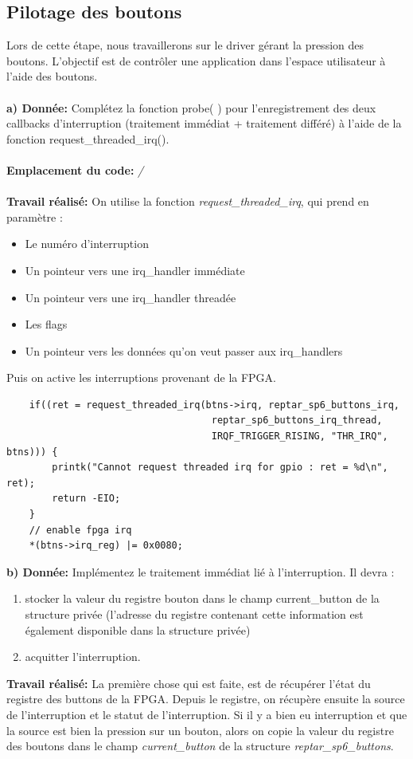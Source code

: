 \subsection{Pilotage des boutons}
Lors de cette étape, nous travaillerons sur le driver gérant la pression des boutons. L'objectif est de
contrôler une application dans l'espace utilisateur à l'aide des boutons.\\\\
\textbf{a) Donnée: }Complétez la fonction probe( ) pour l'enregistrement des deux callbacks d'interruption (traitement
immédiat + traitement différé) à l'aide de la fonction request\_threaded\_irq().\\\\
\color{red}\textbf{Emplacement du code: }\textit{/}\\\\ \color{black}
\textbf{Travail réalisé: }
On utilise la fonction \textit{request\_threaded\_irq}, qui prend en paramètre :
\begin{itemize}
	\item Le numéro d'interruption
	\item Un pointeur vers une irq\_handler immédiate
	\item Un pointeur vers une irq\_handler threadée
	\item Les flags 
	\item Un pointeur vers les données qu'on veut passer aux irq\_handlers
\end{itemize} 
Puis on active les interruptions provenant de la FPGA.
\begin{lstlisting}
	if((ret = request_threaded_irq(btns->irq, reptar_sp6_buttons_irq, 
									reptar_sp6_buttons_irq_thread, 
									IRQF_TRIGGER_RISING, "THR_IRQ", btns))) {
		printk("Cannot request threaded irq for gpio : ret = %d\n", ret);
		return -EIO;
	}
	// enable fpga irq
	*(btns->irq_reg) |= 0x0080;
\end{lstlisting}

\textbf{b) Donnée: }Implémentez le traitement immédiat lié à l'interruption. Il devra :
\begin{enumerate}
	\item stocker la valeur du registre bouton dans le champ current\_button de la structure privée
	(l'adresse du registre contenant cette information est également disponible dans la structure
	privée)
	\item acquitter l'interruption.\\
\end{enumerate}
\textbf{Travail réalisé: }
La première chose qui est faite, est de récupérer l'état du registre des buttons de la FPGA. Depuis le registre, on récupère ensuite la source de l'interruption et le statut de l'interruption. Si il y a bien eu interruption et que la source est bien la pression sur un bouton, alors on copie la valeur du registre des boutons dans le champ \textit{current\_button} de la structure \textit{reptar\_sp6\_buttons}. 

